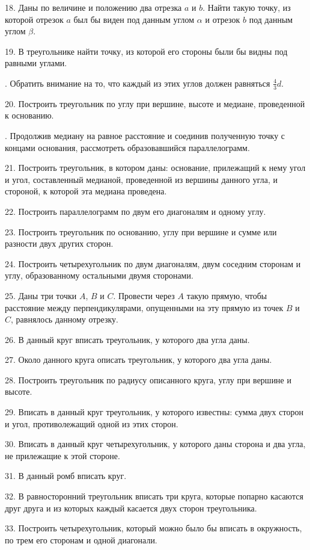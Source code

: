 \documentclass[oneside]{book}
\begin{document}
18.
Даны по величине и положению два отрезка $a$ и $b$.
Найти такую точку, из которой отрезок $a$ был бы виден под данным углом $\alpha$ и отрезок $b$ под данным углом $\beta$.

19.
В треугольнике найти точку, из которой его стороны были бы видны под равными углами.

.
Обратить внимание на то, что каждый из этих углов должен равняться $\tfrac43d$.

20.
Построить треугольник по углу при вершине, высоте и медиане, проведенной к основанию.

.
Продолжив медиану на равное расстояние и соединив полученную точку с концами основания, рассмотреть образовавшийся параллелограмм.

21.
Построить треугольник, в котором даны:
основание, прилежащий к нему угол и угол, составленный медианой, проведенной из вершины данного угла, и стороной, к которой эта медиана проведена.

22.
Построить параллелограмм по двум его диагоналям и одному углу.

23.
Построить треугольник по основанию, углу при вершине и сумме или разности двух других сторон.

24.
Построить четырехугольник по двум диагоналям, двум соседним сторонам и углу, образованному остальными двумя сторонами.

25.
Даны три точки $A$, $B$ и $C$.
Провести через $A$ такую прямую, чтобы расстояние между перпендикулярами, опущенными на эту прямую из точек $B$ и $C$, равнялось данному отрезку.

26.
В данный круг вписать треугольник, у которого два угла даны.

27.
Около данного круга описать треугольник, у которого два угла даны.

28.
Построить треугольник по радиусу описанного круга, углу при вершине и высоте.

29.
Вписать в данный круг треугольник, у которого известны:
сумма двух сторон и угол, противолежащий одной из этих сторон.

30.
Вписать в данный круг четырехугольник, у которого даны сторона и два угла, не прилежащие к этой стороне.

31.
В данный ромб вписать круг.

32.
В равносторонний треугольник вписать три круга, которые попарно касаются друг друга и из которых каждый касается двух сторон треугольника.

33.
Построить четырехугольник, который можно было бы вписать в окружность, по трем его сторонам и одной диагонали.
\end{document}
